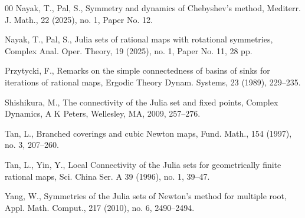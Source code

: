 \documentclass[12pt]{article}
\begin{document}
\begin{thebibliography}{00}
	 Nayak, T., Pal, S., Symmetry and dynamics of Chebyshev's method, Mediterr. J. Math.,  22 (2025), no. 1, Paper No. 12.
	
	 Nayak, T., Pal, S., Julia sets of rational maps with rotational symmetries, Complex Anal. Oper. Theory, 19 (2025), no. 1, Paper No. 11, 28 pp.
	
		Przytycki, F., Remarks on the simple connectedness of basins of sinks for iterations of rational maps, Ergodic Theory Dynam. Systems, 23 (1989), 229--235.
	
	 Shishikura, M., The connectivity of the Julia set and fixed points, Complex Dynamics, A K Peters, Wellesley, MA, 2009, 257--276.
	
	 Tan, L., Branched coverings and cubic Newton maps, Fund. Math., 154 (1997), no. 3, 207--260.
	
	 Tan, L., Yin, Y., Local Connectivity of the Julia sets for geometrically finite rational maps, Sci. China Ser. A 39 (1996), no. 1, 39--47.
	
	 Yang, W., Symmetries of the Julia sets of Newton's method for multiple root,	Appl. Math. Comput., 217 (2010), no. 6, 2490--2494.
\end{thebibliography}
\end{document}
